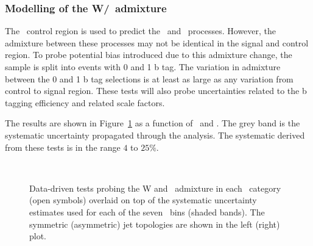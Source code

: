 \subsubsection{Modelling of the W/\ttbar~admixture}

The \mj~control region is used to predict the \wj~and \ttbar~processes. However, the admixture
between these processes may not be identical in the signal and control region.
To probe potential bias introduced due to this admixture change, the sample is split into events with
0 and 1 b tag. The variation in admixture between the 0 and 1 b tag selections is at least as large as 
any variation from control to signal region. These tests will also probe uncertainties related to the b tagging 
efficiency and related scale factors. 

The results are shown in Figure~\ref{fig:closureBTag} as a function of \scalht~and \njet. 
The grey band is the systematic uncertainty propagated through the analysis. 
The systematic derived from these tests is in the range $4$ to $25\%$.

\begin{figure}[h!]
  \begin{center}
    ~~
    \caption{Data-driven tests probing the W and \ttbar~admixture 
      in each \njet~category (open symbols) overlaid on top of the systematic
      uncertainty estimates used for each of the seven \scalht~bins
      (shaded bands). 
      The symmetric (asymmetric) jet topologies are shown in the left (right) plot.      
    }
    \label{fig:closureBTag}
  \end{center} 
\end{figure}

